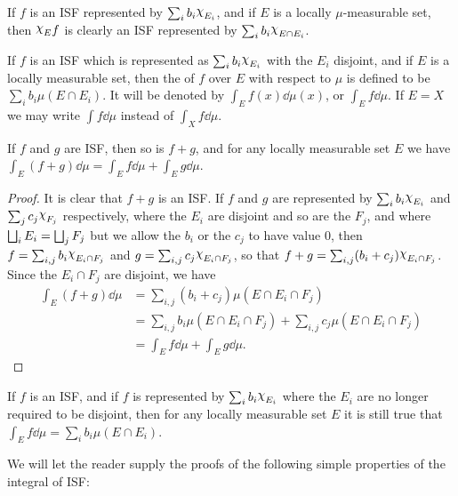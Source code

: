 If $f$ is an ISF represented by $\sum_ib_i\idf{E_i}$, and if $E$ is a locally $\mu$-measurable set, then $\idf{E}f$ is clearly an ISF represented by $\sum_ib_i\idf{E\cap E_i}$.

\begin{definition}
If $f$ is an ISF which is represented as $\sum_i b_i\idf{E_i}$ with the $E_i$ disjoint, and if $E$ is a locally measurable set, then the  of $f$ over $E$ with respect to $\mu$ is defined to be $\sum_ib_i \mu(E \cap E_i)$. It will be denoted by $\int_Ef(x)\dd\mu(x)$, or $\int_Ef\dd\mu$. If $E=X$ we may write $\int f\dd\mu$ instead of $\int_Xf\dd\mu$.
\end{definition}

\begin{lemma}\label{lem:linearity of ISF integral}
If $f$ and $g$ are ISF, then so is $f+g$, and for any locally measurable set $E$ we have $\int_E(f+g)\dd\mu=\int_Ef\dd\mu+\int_Eg\dd\mu$.
\end{lemma}

\begin{proof}
It is clear that $f+g$ is an ISF. If $f$ and $g$ are represented by $\sum_ib_i\idf{E_i}$ and $\sum_jc_j\idf{F_j}$ respectively, where the $E_i$ are disjoint and so are the $F_j$, and where $\bigsqcup_iE_i=\bigsqcup_jF_j$ but we allow the $b_i$ or the $c_j$ to have value 0, then $f=\sum_{i, j}b_i\idf{E_i\cap F_j}$ and $g=\sum_{i, j}c_j \idf{E_i\cap F_j}$, so that $f+g=\sum_{i, j}(b_i+c_j)\idf{E_i\cap F_j}$. Since the $E_i \cap F_j$ are disjoint, we have
\begin{align*}
    \int_E(f+g)\dd\mu&=\sum_{i,j}(b_i+c_j)\mu(E\cap E_i\cap F_j)\\
    &=\sum_{i,j}b_i\mu(E \cap E_i \cap F_j)+\sum_{i,j}c_j\mu(E\cap E_i\cap F_j)\\
    &=\int_Ef\dd\mu+\int_Eg\dd\mu.
\end{align*}
\end{proof}

\begin{corollary}
If $f$ is an ISF, and if $f$ is represented by $\sum_ib_i\idf{E_i}$ where the $E_i$ are no longer required to be disjoint, then for any locally measurable set $E$ it is still true that $\int_Ef\dd\mu=\sum_ib_i\mu(E\cap E_i)$.
\end{corollary}

We will let the reader supply the proofs of the following simple properties of the integral of ISF:

